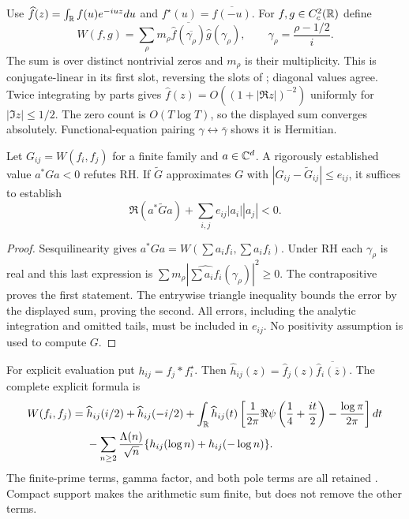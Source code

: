 Use $\widehat f(z)=\int_\mathbb R f(u)e^{-iuz}du$ and
$f^\star(u)=\overline{f(-u)}$. For $f,g\in C_c^2(\mathbb R)$ define
\begin{equation}
 W(f,g)=\sum_{\rho}m_\rho
       \overline{\widehat f(\overline{\gamma_\rho})}
       \widehat g(\gamma_\rho),\qquad
 \gamma_\rho=\frac{\rho-1/2}{i}.
 \label{eq:rh-weil-convention}
\end{equation}
The sum is over distinct nontrivial zeros and $m_\rho$ is their multiplicity.
This is conjugate-linear in its first slot, reversing the slots of
\cite[\S1.2]{alpogeFurman2026}; diagonal values agree.
Twice integrating by parts gives $\widehat f(z)=O((1+|\Re z|)^{-2})$
uniformly for $|\Im z|\le1/2$. The zero count is $O(T\log T)$, so the
displayed sum converges absolutely. Functional-equation pairing
$\gamma\leftrightarrow\overline\gamma$ shows it is Hermitian.

\begin{proposition}
Let $G_{ij}=W(f_i,f_j)$ for a finite family and $a\in\mathbb C^d$. A rigorously
established value $a^*Ga<0$ refutes RH. If $\widetilde G$ approximates $G$
with $|G_{ij}-\widetilde G_{ij}|\le e_{ij}$, it suffices to establish
\begin{equation}
 \Re(a^*\widetilde G a)+\sum_{i,j}e_{ij}|a_i||a_j|<0.
 \label{eq:rh-matrix-certificate}
\end{equation}
\end{proposition}
\begin{proof}
Sesquilinearity gives $a^*Ga=W(\sum a_if_i,\sum a_if_i)$.
Under RH each $\gamma_\rho$ is real and this last expression is
$\sum m_\rho|\widehat{\sum a_if_i}(\gamma_\rho)|^2\ge0$.
The contrapositive proves the first statement. The entrywise triangle
inequality bounds the error by the displayed sum, proving the second.
All errors, including the analytic integration and omitted tails, must be
included in $e_{ij}$. No positivity assumption is used to compute $G$.
\end{proof}

For explicit evaluation put $h_{ij}=f_j*f_i^\star$.
Then $\widehat h_{ij}(z)=\widehat f_j(z)
\overline{\widehat f_i(\overline z)}$. The complete explicit formula is
\begin{align}
 W(f_i,f_j)={}&\widehat h_{ij}(i/2)+\widehat h_{ij}(-i/2)
 +\int_\mathbb R\widehat h_{ij}(t)
 \left[\frac{1}{2\pi}\Re\psi\left(\frac14+\frac{it}{2}\right)
       -\frac{\log\pi}{2\pi}\right]dt \notag\\
 &-\sum_{n\ge2}\frac{\Lambda(n)}{\sqrt n}
       \{h_{ij}(\log n)+h_{ij}(-\log n)\}.
 \label{eq:rh-full-weil-test}
\end{align}
The finite-prime terms, gamma factor, and both pole terms are all retained
\cite{weil1952,alpogeFurman2026}. Compact support makes the arithmetic sum
finite, but does not remove the other terms.

